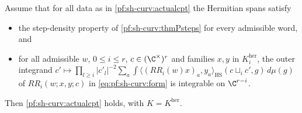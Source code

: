 \begin{proposition}\label{pf:sh-curv:assembly}
Assume that for all data as in \cref{pf:sh-curv:actualcpt} the Hermitian spans satisfy
\begin{itemize}
\item[(SD)] the step-density property of \cref{pf:sh-curv:thmPsteps} for every admissible word, and
\item[(FI)] for all admissible $w$, $0\le i\le r$, $c\in(\C^\times)^r$ and families $x,y$ in $K^{\mathrm{her}}_i$, the outer
integrand $c'\mapsto\prod_{l\ge i}|c'_l|^{-2}\sum_a\int\langle(RR_i(w)x)_a,y_a\rangle_{\mathrm{HS}}(c\sqcup_ic',g)\,d\mu(g)$ of
$RR_i(w;x,y;c)$ in \eqref{eq:pf:sh-curv:form} is integrable on $\C^{r-i}$.
\end{itemize}
Then \cref{pf:sh-curv:actualcpt} holds, with $K=K^{\mathrm{her}}$.
\end{proposition}


